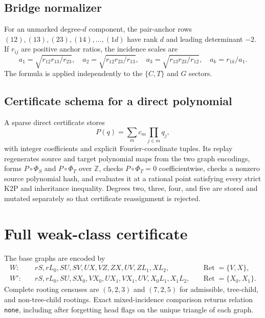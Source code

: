 \documentclass[11pt]{article}
\theoremstyle{remark}
\begin{document}
\subsection{Bridge normalizer}

For an unmarked degree-\(d\) component, the pair-anchor rows
\((12),(13),(23),(14),\ldots,(1d)\) have rank \(d\) and leading determinant
\(-2\).  If \(r_{ij}\) are positive anchor ratios, the incidence scales are
\[
a_1=\sqrt{r_{12}r_{13}/r_{23}},\quad
a_2=\sqrt{r_{12}r_{23}/r_{13}},\quad
a_3=\sqrt{r_{13}r_{23}/r_{12}},\quad
a_k=r_{1k}/a_1.
\]
The formula is applied independently to the \(\{C,T\}\) and \(G\) sectors.

\subsection{Certificate schema for a direct polynomial}

A sparse direct certificate stores
\[
 P(q)=\sum_{m}c_m\prod_{j\in m}q_j,
\]
with integer coefficients and explicit Fourier-coordinate tuples.  Its replay
regenerates source and target polynomial maps from the two graph encodings,
forms \(P\circ\Phi_S\) and \(P\circ\Phi_T\) over \(\mathbb Z\), checks
\(P\circ\Phi_T=0\) coefficientwise, checks a nonzero source polynomial hash,
and evaluates it at a rational point satisfying every strict K2P and
inheritance inequality.  Degrees two, three, four, and five are stored and
mutated separately so that certificate reassignment is rejected.



\section{Full weak-class certificate}\label{sec:sharpness}

The base graphs are encoded by
\begin{align*}
W:&\quad rS,rL_0,SU,SV,UX,VZ,ZX,UV,ZL_1,XL_2,
&&\operatorname{Ret}=\{V,X\},\\
W':&\quad rS,rL_0,SU,SX_0,VX_0,UX_1,VX_1,UV,X_0L_1,X_1L_2,
&&\operatorname{Ret}=\{X_0,X_1\}.
\end{align*}
Complete rooting censuses are \((5,2,3)\) and \((7,2,5)\) for admissible,
tree-child, and non-tree-child rootings.  Exact mixed-incidence comparison
returns relation \texttt{none}, including after forgetting head flags on the
unique triangle of each graph.
\end{document}
